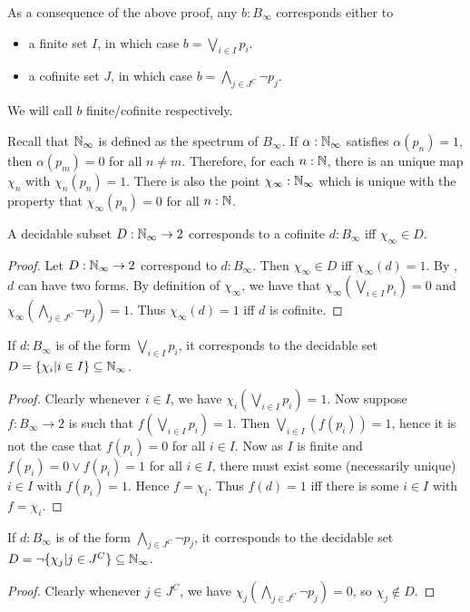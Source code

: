 \begin{remark}\label{AppendixCofiniteOrFinite}
  As a consequence of the above proof, any $b:B_\infty$ corresponds either to 
  \begin{itemize}
    \item a finite set $I$, in which case $b = \bigvee_{i\in I} p_i$. 
    \item a cofinite set $J$, in which case $b = \bigwedge_{j\in J^C} \neg p_j$. 
  \end{itemize}
  We will call $b$ finite/cofinite respectively. 
\end{remark}
\begin{remark}
Recall that $\mathbb{N}_{\infty}$ is defined as the spectrum of $B_\infty$. 
If $\alpha:\mathbb{N}_{\infty}$ satisfies $\alpha(p_n) = 1$, then $\alpha(p_m) = 0$ for all $n\neq m$. 
Therefore, for each $n:\mathbb{N}$, there is an unique map $\chi_n$ with $\chi_n(p_n) = 1$. 
There is also the point $\chi_\infty : \mathbb{N}_{\infty}$ which is unique 
with the property that $ \chi_\infty(p_n) = 0$ for all $n:\mathbb{N}$. 
\end{remark}
\begin{lemma}
  A decidable subset $D: \mathbb{N}_{\infty} \to 2$ corresponds to a cofinite $d:B_\infty$ iff $\chi_\infty\in D$. 
\end{lemma}
\begin{proof}
  Let $D:\mathbb{N}_{\infty} \to 2$ correspond to $d:B_\infty$.
  Then $\chi_\infty\in D$ iff $\chi_\infty(d) = 1$. 
%
  By , $d$ can have two forms.
  By definition of $\chi_\infty$, we have that 
  $\chi_\infty(\bigvee_{i\in I} p_i) = 0$ and 
  $\chi_\infty(\bigwedge_{j\in J^C} \neg p_j) = 1$. 
  Thus $\chi_\infty(d) = 1$ iff $d$ is cofinite. 
\end{proof}
\begin{lemma}
  If $d:B_\infty$ is of the form $\bigvee_{i\in I} p_i$,
  it corresponds to the decidable set 
  $D = \{\chi_i | i \in I\} \subseteq \mathbb{N}_{\infty}$.
\end{lemma}
\begin{proof}
  Clearly whenever $i\in I$, we have $\chi_i(\bigvee_{i\in I} p_i) = 1$. 
  Now suppose $f:B_\infty \to 2$ is such that $f(\bigvee_{i\in I} p_i) = 1$. 
  Then $\bigvee_{i\in I}(f(p_i)) = 1$, hence it is not the case that $f(p_i) = 0$ for all $i\in I$. 
  Now as $I$ is finite and $f(p_i) = 0 \vee f(p_i) = 1$ for all $i\in I$, 
  there must exist some (necessarily unique) $i\in I$ with $f(p_i) = 1$. Hence $f = \chi_i$. 
  Thus $f(d) = 1$ iff there is some $i\in I$ with $f = \chi_i$. 
\end{proof}
\begin{lemma}
  If $d:B_\infty$ is of the form $\bigwedge_{j\in J^C} \neg p_j$,
  it corresponds to the decidable set 
  $D = \neg \{\chi_j | j \in J^C\} \subseteq \mathbb{N}_{\infty}$.
\end{lemma}
\begin{proof}
  Clearly whenever $j\in J^C$, we have 
  $\chi_j(\bigwedge_{j\in J^C} \neg p_j) = 0$, so $\chi_j \notin D$. 

\end{proof}


